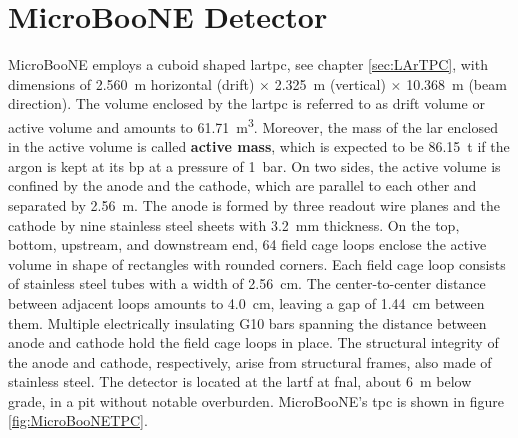 \section{MicroBooNE Detector} \label{sec:MicroBooNEDetector}
MicroBooNE employs a cuboid shaped \gls{lartpc}, see chapter \ref{sec:LArTPC}, with dimensions of \SI{2.560}{\metre} horizontal (drift) $\times$ \SI{2.325}{\metre} (vertical) $\times$ \SI{10.368}{\metre} (beam direction). The volume enclosed by the \gls{lartpc} is referred to as drift volume or active volume and amounts to \SI{61.71}{\metre\cubed}. Moreover, the mass of the \gls{lar} enclosed in the active volume is called \textbf{active mass}, which is expected to be \SI{86.15}{\tonne} if the argon is kept at its \gls{bp} at a pressure of \SI{1}{\bar}. On two sides, the active volume is confined by the anode and the cathode, which are parallel to each other and separated by \SI{2.56}{\metre}. The anode is formed by three readout wire planes and the cathode by nine stainless steel sheets with \SI{3.2}{\milli\metre} thickness. On the top, bottom, upstream, and downstream end, \num{64} field cage loops enclose the active volume in shape of rectangles with rounded corners. Each field cage loop consists of stainless steel tubes with a width of \SI{2.56}{\centi\metre}. The center-to-center distance between adjacent loops amounts to \SI{4.0}{\centi\metre}, leaving a gap of \SI{1.44}{\centi\metre} between them. Multiple electrically insulating \gls{G10} bars spanning the distance between anode and cathode hold the field cage loops in place. The structural integrity of the anode and cathode, respectively, arise from structural frames, also made of stainless steel. The detector is located at the \gls{lartf} at \gls{fnal}, about \SI{6}{\metre} below grade, in a pit without notable overburden. MicroBooNE's \gls{tpc} is shown in figure \ref{fig:MicroBooNETPC}.
